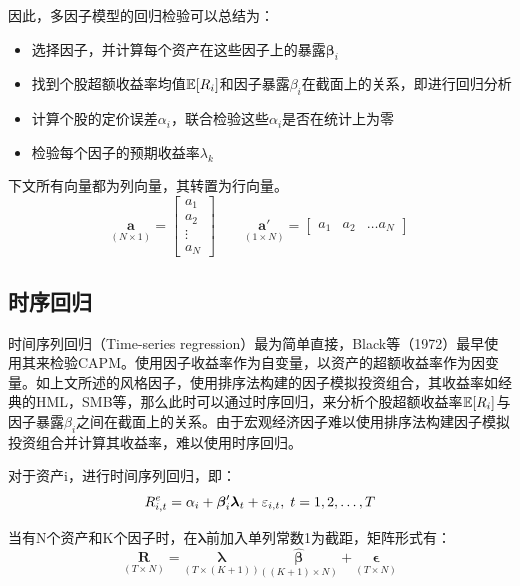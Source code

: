 \documentclass[11pt]{article}
\begin{document}
因此，多因子模型的回归检验可以总结为：
\begin{itemize}
    \item 选择因子，并计算每个资产在这些因子上的暴露$\bm{\beta}_i$
    \item 找到个股超额收益率均值$\mathbb{E}[R_{i}]$和因子暴露$\beta_i$在截面上的关系，即进行回归分析
    \item 计算个股的定价误差$\alpha_i$，联合检验这些$\alpha_i$是否在统计上为零
    \item 检验每个因子的预期收益率$\lambda_k$
\end{itemize}

下文所有向量都为列向量，其转置为行向量。
\begin{equation*}
    \underset{\scriptscriptstyle{(N \times 1)}}{\bm{a}}
    = \begin{bmatrix} a_1 \\ a_2 \\ \vdots \\ a_N \end{bmatrix}
    \qquad
    \underset{\scriptscriptstyle{(1 \times N)}}{\bm{a}'}
    = \begin{bmatrix} a_1 & a_2 & \dots a_N \end{bmatrix}
\end{equation*}

\subsection{时序回归}

时间序列回归（Time-series regression）最为简单直接，Black等（1972）最早使用其来检验CAPM。使用因子收益率作为自变量，以资产的超额收益率作为因变量。如上文所述的风格因子，使用排序法构建的因子模拟投资组合，其收益率如经典的HML，SMB等，那么此时可以通过时序回归，来分析个股超额收益率$\mathbb{E}[R_i]$与因子暴露$\beta_i$之间在截面上的关系。由于宏观经济因子难以使用排序法构建因子模拟投资组合并计算其收益率，难以使用时序回归。

对于资产i，进行时间序列回归，即：
\begin{equation*}
    R_{i,t}^{e} = \alpha_i + \bm{\beta}_{i}' \bm{\lambda}_t + \varepsilon_{i,t} ,\; t=1,2,\dots,T
\end{equation*}

当有N个资产和K个因子时，在$\bm{\lambda}$前加入单列常数1为截距，矩阵形式有：
\begin{equation*}
    \underset{\scriptscriptstyle{(T \times N)}}{\bm{R}}
    = \underset{\scriptscriptstyle{\left(T \times (K+1)\right)}}{\bm{\lambda}}
    \underset{\scriptscriptstyle{\left((K+1) \times N\right)}}{\hat{\bm{\beta}}} 
    + \underset{\scriptscriptstyle{(T \times N)}}{\bm{\epsilon}}
\end{equation*}
\end{document}
